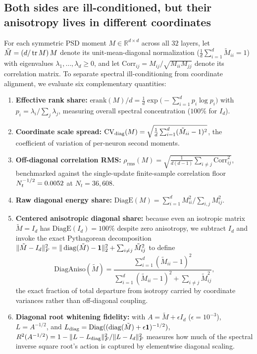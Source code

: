 \subsection{Both sides are ill-conditioned, but their anisotropy lives in different coordinates}
\label{sec:mot-aniso}

For each symmetric PSD moment $M\in\mathbb R^{d\times d}$ across all $32$
layers, let $\tilde M = (d/\operatorname{tr} M)\,M$ denote its unit-mean-diagonal
normalization ($\frac{1}{d}\sum_{i=1}^d \tilde M_{ii}=1$) with eigenvalues
$\lambda_1,\dots,\lambda_d \ge 0$, and let
$\mathrm{Corr}_{ij} = M_{ij}/\sqrt{M_{ii}M_{jj}}$ denote its correlation matrix.
To separate spectral ill-conditioning from coordinate alignment, we evaluate six
complementary quantities:
\begin{enumerate}
\item \textbf{Effective rank share:}
  $\mathrm{erank}(M)/d = \frac{1}{d}\exp\!\bigl(-\sum_{i=1}^d p_i\log p_i\bigr)$
  with $p_i = \lambda_i / \sum_j \lambda_j$, measuring overall spectral
  concentration ($100\%$ for $I_d$).
\item \textbf{Coordinate scale spread:}
  $\mathrm{CV}_{\operatorname{diag}}(M) = \sqrt{\frac{1}{d}\sum_{i=1}^d (\tilde M_{ii}-1)^2}$,
  the coefficient of variation of per-neuron second moments.
\item \textbf{Off-diagonal correlation RMS:}
  $\rho_{\mathrm{rms}}(M) = \sqrt{\frac{1}{d(d-1)}\sum_{i\neq j}\mathrm{Corr}_{ij}^2}$,
  benchmarked against the single-update finite-sample correlation floor
  $N_t^{-1/2} = 0.0052{}$ at $N_t=36{,}608$.
\item \textbf{Raw diagonal energy share:}
  $\mathrm{DiagE}(M) = \sum_{i=1}^d M_{ii}^2 / \sum_{i,j} M_{ij}^2$.
\item \textbf{Centered anisotropic diagonal share:} because even an isotropic
  matrix $\tilde M = I_d$ has $\mathrm{DiagE}(I_d)=100\%$ despite zero
  anisotropy, we subtract $I_d$ and invoke the exact Pythagorean decomposition
  $\|\tilde M - I_d\|_F^2 = \|\operatorname{diag}(\tilde M)-\mathbf 1\|_2^2 + \sum_{i\neq j}\tilde M_{ij}^2$
  to define
  \begin{equation}
  \label{eq:diaganiso}
  \mathrm{DiagAniso}(\tilde M)
  = \frac{\sum_{i=1}^d (\tilde M_{ii}-1)^2}{\sum_{i=1}^d (\tilde M_{ii}-1)^2 + \sum_{i\neq j}\tilde M_{ij}^2},
  \end{equation}
  the exact fraction of total departure from isotropy carried by coordinate
  variances rather than off-diagonal coupling.
\item \textbf{Diagonal root whitening fidelity:} with $A = \tilde M + \epsilon I_d$
  ($\epsilon = 10^{-3}$), $L = A^{-1/2}$, and
  $L_{\operatorname{diag}} = \operatorname{Diag}((\operatorname{diag}(\tilde M)+\epsilon\mathbf 1)^{-1/2})$,
  $R^2(A^{-1/2}) = 1 - \|L - L_{\operatorname{diag}}\|_F^2 / \|L - I_d\|_F^2$ measures how
  much of the spectral inverse square root's action is captured by elementwise
  diagonal scaling.
\end{enumerate}

